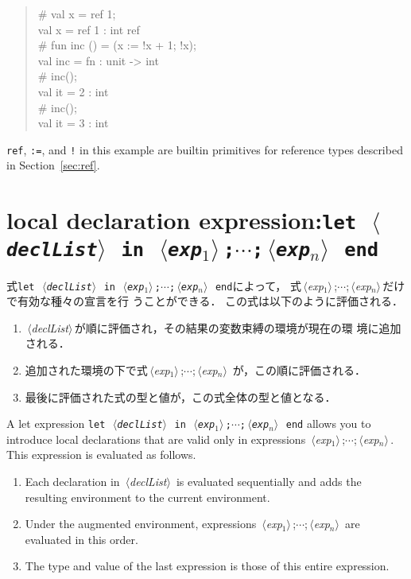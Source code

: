 \documentclass{jbook}
\newcommand{\txt}[2]{#2}
\newcommand{\code}[1]{\mbox{\large\tt #1}}
\newcommand{\nonterm}[1]{\mbox{$\,\langle$}{\it #1}\mbox{$\rangle\,$}}
\newcommand{\term}[1]{\mbox{{\tt #1}}}
\newenvironment{program}{\begin{quote}\begin{tt}}%
                        {\end{tt}\end{quote}}
\begin{document}
\begin{program}
\# val x = ref 1;
\\
val x = ref 1 : int ref
\\
\# fun inc () = (x := !x + 1; !x);
\\
val inc = fn : unit -> int
\\
\# inc();
\\
val it = 2 : int
\\
\# inc();
\\
val it = 3 : int
\end{program}
	\code{ref}, \code{:=}, and \code{!} in this example are
builtin primitives for reference types described in
Section~\ref{sec:ref}.

\fi%


\section{\txt{局所宣言式}{local declaration expression}:\term{let\ \nonterm{declList}\ in\ \nonterm{exp$_1$};$\cdots$;\nonterm{exp$_n$} end}}

\ifjp%
	式\term{let\ \nonterm{declList}\ in\
\nonterm{exp$_1$};$\cdots$;\nonterm{exp$_n$} end}によって，
式\nonterm{exp$_1$};$\cdots$;\nonterm{exp$_n$}だけで有効な種々の宣言を行
うことができる．
	この式は以下のように評価される．
\begin{enumerate}
\item \nonterm{declList}が順に評価され，その結果の変数束縛の環境が現在の環
境に追加される．
\item 追加された環境の下で式\nonterm{exp$_1$};$\cdots$;\nonterm{exp$_n$}
が，この順に評価される．
\item 最後に評価された式の型と値が，この式全体の型と値となる．
\end{enumerate}
\else%
	A let expression
\term{let\ \nonterm{declList}\ in\
\nonterm{exp$_1$};$\cdots$;\nonterm{exp$_n$} end}
allows you to introduce local declarations that
are valid only in expressions
\nonterm{exp$_1$};$\cdots$;\nonterm{exp$_n$}.
	This expression is evaluated as follows.
\begin{enumerate}
\item Each declaration in \nonterm{declList} is evaluated sequentially
and adds the resulting environment to the current environment.
\item Under the augmented environment, expressions
\nonterm{exp$_1$};$\cdots$;\nonterm{exp$_n$} are evaluated in
this order.
\item The type and value of the last expression is those of this
entire expression.
\end{enumerate}
\fi%
\end{document}
